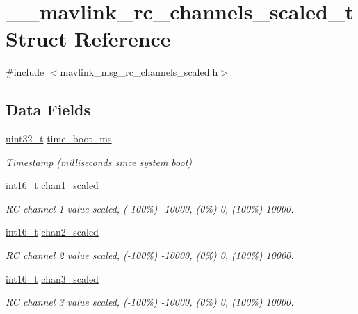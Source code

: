 \hypertarget{struct____mavlink__rc__channels__scaled__t}{\section{\-\_\-\-\_\-mavlink\-\_\-rc\-\_\-channels\-\_\-scaled\-\_\-t Struct Reference}
\label{struct____mavlink__rc__channels__scaled__t}
}


{\ttfamily \#include $<$mavlink\-\_\-msg\-\_\-rc\-\_\-channels\-\_\-scaled.\-h$>$}

\subsection*{Data Fields}
\begin{DoxyCompactItemize}
\item 
\hyperlink{stdint_8h_a435d1572bf3f880d55459d9805097f62}{uint32\-\_\-t} \hyperlink{struct____mavlink__rc__channels__scaled__t_ae035a89efbc6107932416a1a65268bfe}{time\-\_\-boot\-\_\-ms}
\begin{DoxyCompactList}\small\item\em Timestamp (milliseconds since system boot) \end{DoxyCompactList}\item 
\hyperlink{stdint_8h_aa343fa3b3d06292b959ffdd4c4703b06}{int16\-\_\-t} \hyperlink{struct____mavlink__rc__channels__scaled__t_a2d350897e12b0008208e61a031f01270}{chan1\-\_\-scaled}
\begin{DoxyCompactList}\small\item\em R\-C channel 1 value scaled, (-\/100\%) -\/10000, (0\%) 0, (100\%) 10000. \end{DoxyCompactList}\item 
\hyperlink{stdint_8h_aa343fa3b3d06292b959ffdd4c4703b06}{int16\-\_\-t} \hyperlink{struct____mavlink__rc__channels__scaled__t_a8ca88934095102f7195b4e5ab88ecd5c}{chan2\-\_\-scaled}
\begin{DoxyCompactList}\small\item\em R\-C channel 2 value scaled, (-\/100\%) -\/10000, (0\%) 0, (100\%) 10000. \end{DoxyCompactList}\item 
\hyperlink{stdint_8h_aa343fa3b3d06292b959ffdd4c4703b06}{int16\-\_\-t} \hyperlink{struct____mavlink__rc__channels__scaled__t_a1f6f236dabbe2174233f2bf4e16f3c7d}{chan3\-\_\-scaled}
\begin{DoxyCompactList}\small\item\em R\-C channel 3 value scaled, (-\/100\%) -\/10000, (0\%) 0, (100\%) 10000. \end{DoxyCompactList}\item 

\end{DoxyCompactItemize}
